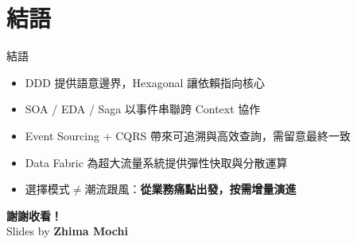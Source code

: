 \documentclass[UTF8]{beamer}
\begin{document}
\section{結語}
\begin{frame}{結語}
    \begin{itemize}
        \item DDD 提供語意邊界，Hexagonal 讓依賴指向核心
        \item SOA / EDA / Saga 以事件串聯跨 Context 協作
        \item Event Sourcing + CQRS 帶來可追溯與高效查詢，需留意最終一致
        \item Data Fabric 為超大流量系統提供彈性快取與分散運算
        \item 選擇模式\textbf{$\neq$}潮流跟風：\textbf{從業務痛點出發，按需增量演進}
    \end{itemize}
    \vspace{1em}
\end{frame}

\begin{frame}
    \centering
    \Huge \textbf{謝謝收看！} \\
    \vspace{1cm}
    \normalsize Slides by \textbf{Zhima Mochi}
\end{frame}
\end{document}
